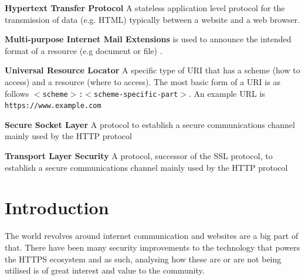 \documentclass{mscreport}
\begin{document}
\begin{hangparas}{.25in}{1}
\textbf{Hypertext Transfer Protocol} A stateless application level protocol \cite{Berners-Lee1996-ji} for the transmission of data (e.g. HTML) typically between a website and a web browser. \par
\vspace{0.5cm}
\textbf{Multi-purpose Internet Mail Extensions} is used to announce the intended format of a resource (e.g document or file) \cite{Freed2013-yn}. \par
\vspace{0.5cm}
\textbf{Universal Resource Locator} A specific type of URI that has a scheme (how to access) and a resource (where to access). The most basic form of a URI is as follows \texttt{$<$scheme$>$:$<$scheme-specific-part$>$}. An example URL is \newline \texttt{https://www.example.com} \par
\vspace{0.5cm}
\textbf{Secure Socket Layer} A protocol to establish a secure communications channel mainly used by the HTTP protocol \par
\vspace{0.5cm}
\textbf{Transport Layer Security} A protocol, successor of the SSL protocol, to establish a secure communications channel mainly used by the HTTP protocol \par

\end{hangparas}
\clearpage
\newpage

\listoffigures

\clearpage
\newpage
{}
\listoftables

\clearpage
\newpage





\tableofcontents

\newpage
{}
\section{Introduction}
\label{section:intro}

\noindent
The world revolves around internet communication and websites are a big part of that. There have been many security improvements to the technology that powers the HTTPS ecosystem and as such, analysing how these are or are not being utilised is of great interest and value to the community.
\end{document}
